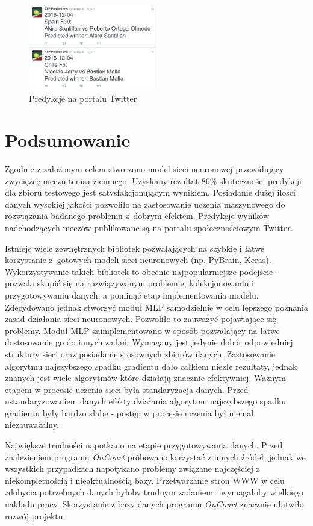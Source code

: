 \begin{figure}
\centering
\includegraphics[width=0.5\textwidth]{atp_pred.png}
\caption{Predykcje na portalu Twitter}
\label{fig:preds}
\end{figure}

\chapter{Podsumowanie}
Zgodnie z założonym celem stworzono model sieci neuronowej przewidujący zwycięzcę meczu tenisa ziemnego. Uzyskany rezultat 86\% skuteczności predykcji dla zbioru testowego jest satysfakcjonującym wynikiem. Posiadanie dużej ilości danych wysokiej jakości pozwoliło na zastosowanie uczenia maszynowego do rozwiązania badanego problemu z~dobrym efektem. Predykcje wyników nadchodzących meczów publikowane są na portalu społecznościowym Twitter.

Istnieje wiele zewnętrznych bibliotek pozwalających na szybkie i łatwe korzystanie z~gotowych modeli sieci neuronowych (np. PyBrain, Keras). Wykorzystywanie takich bibliotek to obecnie najpopularniejsze podejście - pozwala skupić się na rozwiązywanym problemie, kolekcjonowaniu i przygotowywaniu danych, a pominąć etap implementowania modelu. Zdecydowano jednak stworzyć moduł MLP samodzielnie w celu lepszego poznania zasad działania sieci neuronowych. Pozwoliło to zauważyć pojawiające się problemy. Moduł MLP zaimplementowano w sposób pozwalający na łatwe dostosowanie go do innych zadań. Wymagany jest jedynie dobór odpowiedniej struktury sieci oraz posiadanie stosownych zbiorów danych. Zastosowanie algorytmu najszybszego spadku gradientu dało całkiem niezłe rezultaty, jednak znanych jest wiele algorytmów które działają znacznie efektywniej. Ważnym etapem w procesie uczenia sieci była standaryzacja danych. Przed ustandaryzowaniem danych efekty działania algorytmu najszybszego spadku gradientu były bardzo słabe - postęp w procesie uczenia był niemal niezauważalny. 

Największe trudności napotkano na etapie przygotowywania danych. Przed znalezieniem programu \textit{OnCourt} próbowano korzystać z innych źródeł, jednak we wszystkich przypadkach napotykano problemy związane najczęściej z niekompletnością i nieaktualnością bazy. Przetwarzanie stron WWW w celu zdobycia potrzebnych danych byłoby trudnym zadaniem i wymagałoby wielkiego nakładu pracy. Skorzystanie z bazy danych programu \textit{OnCourt} znacznie ułatwiło rozwój projektu.

